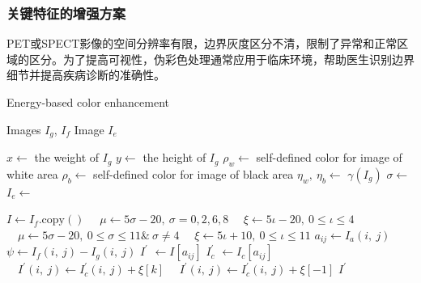 \subsubsection{关键特征的增强方案}\label{chapter3.2:Enhancement_of_key_features}
PET或SPECT影像的空间分辨率有限，边界灰度区分不清，限制了异常和正常区域的区分。为了提高可视性，伪彩色处理通常应用于临床环境，帮助医生识别边界细节并提高疾病诊断的准确性。


\begin{algorithm}[htbp]
\caption{Energy-based color enhancement}\label{paper2enhanceAlgorithm}
\centering
\begin{algorithmic}  [1]
    \Require Images $I_g$, $I_f$  
    \Ensure Image $I_e$
    
    \State $x \leftarrow $ the weight of $I_g$
    \State $y \leftarrow $ the height of $I_g$
    \State $\rho_w \leftarrow$ self-defined color for image of white area
    \State $\rho_b \leftarrow$ self-defined color for image of black area 
    \State $\eta_w,~ \eta_b \leftarrow$ $\gamma(I_g)$  %
    \State $\sigma \leftarrow$ 
    \State $I_e \leftarrow$ 
    \end{algorithmic} 
    
\begin{algorithmic}[1]
   \State $I \leftarrow I_f.\text{copy}()$
            \State $\quad \mu \leftarrow 5\sigma-20, ~\sigma=0,2,6,8$ %
            \State $\quad \xi \leftarrow 5\iota-20,~0 \le \iota \le 4$
            \State $\quad \mu \leftarrow 5\sigma-20,~0 \le \sigma \le 11 \&~\sigma\neq4$
            \State $\quad \xi \leftarrow 5\iota+10,~0 \le \iota \le 11$
         \EndIf
                    \State $ a_{ij} \leftarrow I_a(i, ~j)$
                    \State $ \psi \leftarrow I_f(i, ~j) - I_g(i, ~j)$
                        \State $ I^{'}$  $\leftarrow I[a_{ij}]$
                        \State $ I_{c}^{'}$  $\leftarrow I_c[a_{ij}]$
                        \If{$\psi \leq \mu[k]$}
                            \State $\quad I^{'}(i, ~j) \leftarrow I_{c}^{'}(i, ~j) + \xi[k]$
                         \Else
                            \State $\quad I^{'}(i, ~j) \leftarrow I_{c}^{'}(i, ~j) + \xi[-1]$
                         \EndIf
                    \EndFor
                 \EndIf
            \EndFor
        \EndFor
      \State \Return $I^{'}$
\EndFunction
\end{algorithmic}
\end{algorithm}

